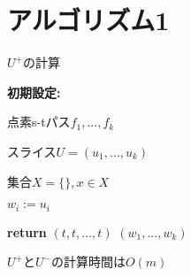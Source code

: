 \documentclass{jarticle}
\theoremstyle{definition}
\begin{document}
\section*{アルゴリズム1}

\begin{algorithm}[H]
       \caption{$U^+$の計算} 
        \textbf{初期設定:} \par
        点素s-tパス$f_1,...,f_k$ \par
        スライス$U=(u_1,...,u_k)$ \par
        集合$X=\{\},x\in X$ \par 
        $w_i := u_i$ \Comment {}\par
        {\setlength{\baselineskip}{10pt}
        \begin{algorithmic}[1]
           
          \EndFor
            \State \textbf{return} $(t,t,...,t)$
            \Else 
            \EndIf
          \EndWhile
           $(w_1,...,w_k)$
        \end{algorithmic}
        }
\end{algorithm}
$U^+$と$U^-$の計算時間は$O(m)$


\newpage
\end{document}
